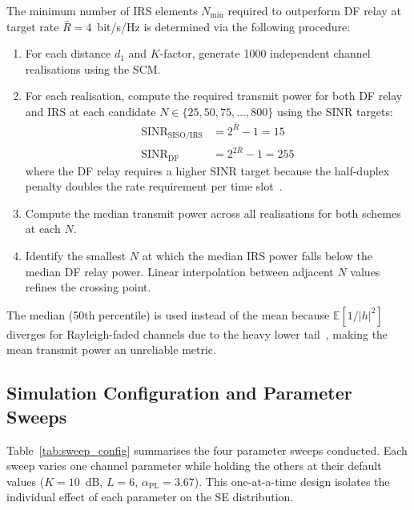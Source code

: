 \documentclass[journal]{IEEEtran} %
\begin{document}
The minimum number of IRS elements $N_{\mathrm{min}}$ required to outperform DF relay at target rate $\bar{R} = 4$~bit/s/Hz is determined via the following procedure:

\begin{enumerate}
    \item For each distance $d_1$ and $K$-factor, generate 1000 independent channel realisations using the SCM.
    \item For each realisation, compute the required transmit power for both DF relay and IRS at each candidate $N \in \{25, 50, 75, \ldots, 800\}$ using the SINR targets:
    \begin{align}
        \mathrm{SINR}_{\mathrm{SISO/IRS}} &= 2^{\bar{R}} - 1 = 15 \label{eq:sinr_irs} \\
        \mathrm{SINR}_{\mathrm{DF}} &= 2^{2\bar{R}} - 1 = 255 \label{eq:sinr_df}
    \end{align}
    where the DF relay requires a higher SINR target because the half-duplex penalty doubles the rate requirement per time slot~\cite{bjornson2020irs}.
    \item Compute the median transmit power across all realisations for both schemes at each $N$.
    \item Identify the smallest $N$ at which the median IRS power falls below the median DF relay power. Linear interpolation between adjacent $N$ values refines the crossing point.
\end{enumerate}

The median (50th percentile) is used instead of the mean because $\mathbb{E}[1/|h|^2]$ diverges for Rayleigh-faded channels due to the heavy lower tail~\cite{tse2005fundamentals}, making the mean transmit power an unreliable metric.

\subsection{Simulation Configuration and Parameter Sweeps}

Table~\ref{tab:sweep_config} summarises the four parameter sweeps conducted. Each sweep varies one channel parameter while holding the others at their default values ($K = 10$~dB, $L = 6$, $\alpha_{\mathrm{PL}} = 3.67$). This one-at-a-time design isolates the individual effect of each parameter on the SE distribution.
\end{document}
